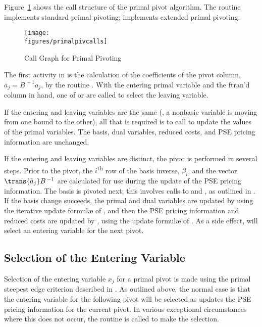 Figure~\ref{fig:PrimalPivotCallGraph} shows the call structure of the primal
pivot algorithm.
The routine  implements standard primal pivoting;
 implements extended primal pivoting.

\begin{figure}[htb]
\centering
\texttt{[image: \\figures/primalpivcalls]}
\caption{Call Graph for Primal Pivoting} \label{fig:PrimalPivotCallGraph}
\end{figure}

The first activity in  is the calculation of the
coefficients of the pivot column, $\overline{a}_{j} = B^{\,-1} a_j$, by
the routine .
With the entering primal variable and the ftran'd column in hand, one of
 or  are called to select the leaving
variable.

If the entering and leaving variables are the same (\ie, a nonbasic variable is
moving from one bound to the other), all that is required is to call
 to update the values of the primal variables.
The basis, dual variables, reduced costs, and PSE pricing information are
unchanged.

If the entering and leaving variables are distinct, the pivot
is performed in several steps.
Prior to the pivot, the $i$\textsuperscript{th} row of the basis inverse,
$\beta_i$, and the vector $\trans{\tilde{a}_j} B^{\,-1}$ are calculated for
use during the update of the PSE pricing information.
The basis is pivoted next; this involves calls to  and
, as outlined in .
If the basis change succeeds, the primal and dual variables are updated by
 using the iterative update formul\ae{} of
, and then the PSE pricing information
and reduced
costs are updated by , using the update formul\ae{} of
.
As a side effect,  will select an entering variable for the
next pivot.

\subsection{Selection of the Entering Variable}
\label{sec:PrimalStdSelectInVar}

Selection of the entering variable $x_j$ for a primal pivot is made using
the primal steepest edge criterion described in .
As outlined above, the normal case is that the entering variable for the
following pivot will
be selected as  updates the PSE pricing information
for the current pivot.
In various exceptional circumstances where this does not occur, the routine
 is called to make the selection.

